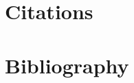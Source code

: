 \documentclass{article}
\let\cite\textcite
\begin{document}
\section{Citations}

\cite{001}
\cite{002}
\cite{003}

\section{Bibliography}

\printbibliography
\end{document}
